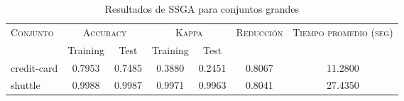 \begin{table}[]
\centering
\begin{tabular}{l c c c c c c}
\hline
\multirow{2}{*}{\textsc{Conjunto}}
	& \multicolumn{2}{c}{\textsc{Accuracy}}
	& \multicolumn{2}{c}{\textsc{Kappa}}
	& \textsc{Reducción}
	& \textsc{Tiempo promedio (seg)} \\
	& Training & Test
	& Training & Test \\ 
\hline
\hline

credit-card & 0.7953 & 0.7485 & 0.3880 & 0.2451 & 0.8067 & 11.2800 \\
shuttle & 0.9988 & 0.9987 & 0.9971 & 0.9963 & 0.8041 & 27.4350 \\

\hline
\end{tabular}
\caption{Resultados de SSGA para conjuntos grandes }
\label{res-grande-ssga}
\end{table}


